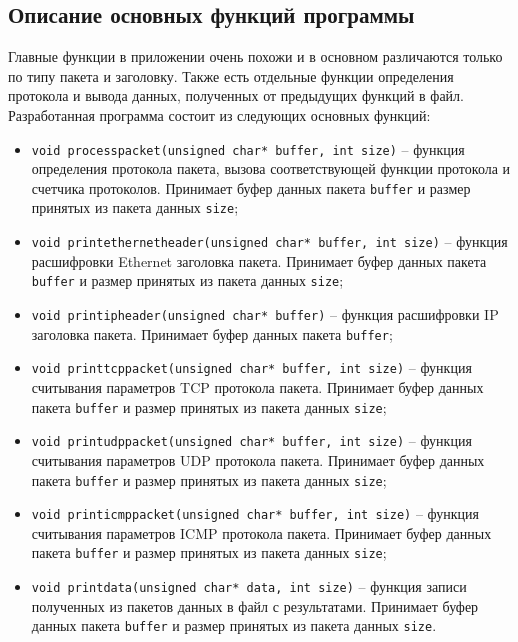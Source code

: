 \subsection{Описание основных функций программы}

Главные функции в приложении очень похожи и в основном различаются только по типу пакета и 
заголовку. Также есть отдельные функции определения протокола и вывода данных, полученных 
от предыдущих функций в файл. Разработанная программа состоит из следующих основных функций:

\begin{itemize}
    \item \texttt{void process{\textunderscore}packet(unsigned char* buffer, int size)} --
    функция определения протокола пакета, вызова соответствующей функции протокола и 
    счетчика протоколов. Принимает буфер данных пакета \texttt{buffer} и размер принятых из 
    пакета данных \texttt{size};
    \item \texttt{void print{\textunderscore}ethernet{\textunderscore}header(unsigned char* 
    buffer, int size)} -- функция расшифровки Ethernet заголовка пакета. 
    Принимает буфер данных пакета \texttt{buffer} и размер принятых из пакета данных \texttt{size};
    \item \texttt{void print{\textunderscore}ip{\textunderscore}header(unsigned char* buffer)} --
    функция расшифровки IP заголовка пакета. Принимает буфер данных пакета \texttt{buffer};
    \item \texttt{void print{\textunderscore}tcp{\textunderscore}packet(unsigned char* buffer, 
    int size)} -- функция считывания параметров TCP протокола пакета. Принимает буфер данных 
    пакета \texttt{buffer} и размер принятых из пакета данных \texttt{size};
    \item \texttt{void print{\textunderscore}udp{\textunderscore}packet(unsigned char* buffer, 
    int size)} -- функция считывания параметров UDP протокола пакета. Принимает буфер данных 
    пакета \texttt{buffer} и размер принятых из пакета данных \texttt{size};
    \item \texttt{void print{\textunderscore}icmp{\textunderscore}packet(unsigned char* buffer, 
    int size)} -- функция считывания параметров ICMP протокола пакета. Принимает буфер данных 
    пакета \texttt{buffer} и размер принятых из пакета данных \texttt{size};
    \item \texttt{void print{\textunderscore}data(unsigned char* data, int size)} --
    функция записи полученных из пакетов данных в файл с результатами. Принимает буфер данных 
    пакета \texttt{buffer} и размер принятых из пакета данных \texttt{size}.
\end{itemize}
